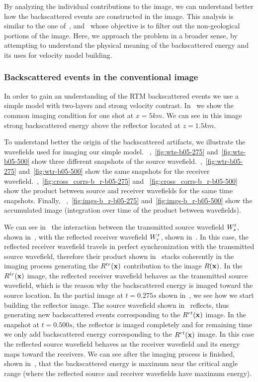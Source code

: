 By analyzing the individual contributions to the image, we can understand better how the backscattered events
are constructed in the image. This analysis is similar to the one of~\cite{fei:3130}, and~\cite{liu:S29}
whose objective is to filter out the non-geological portions of the image. Here, we approach the problem 
in a broader sense, by attempting to understand the physical meaning of the backscattered energy and its
uses for velocity model building.


\subsubsection{Backscattered events in the conventional image}

In order to gain an understanding of the RTM backscattered events we use a simple model with two-layers and strong velocity
contrast. In~ we show the common imaging condition for one shot at $x=5km$. We can see in this image strong 
backscattered energy above the reflector located at $z=1.5km$.

To understand better the origin of the backscattered artifacts, we illustrate the wavefields used for imaging our simple model.
~,~\ref{fig:wts-b05-275} and~\ref{fig:wts-b05-500} show three different snapshots
of the source wavefield.~,~\ref{fig:wtr-b05-275} and~\ref{fig:wtr-b05-500}
show the same snapshots for the receiver wavefield.~,~\ref{fig:cross_corrs-b_r-b05-275} and
~\ref{fig:cross_corrs-b_r-b05-500} show the product between source and receiver wavefields for the same time snapshots. Finally,
~,~\ref{fig:imgs-b_r-b05-275} and~\ref{fig:imgs-b_r-b05-500} show the accumulated image (integration over time of 
the product between wavefields).

We can see in~ the interaction between the transmitted source wavefield ${W_s^t}$, shown in~, with 
the reflected receiver wavefield ${W_r^r}$, shown in~. In this case, the reflected receiver wavefield travels in perfect synchronization
with the transmitted source wavefield, therefore their product shown in~ stacks coherently in the imaging 
process generating the $R^{tr}({\bf x})$ contribution to the image $R({\bf x})$. In the $R^{tr}({\bf x})$ image, the reflected 
receiver wavefield behaves as the transmitted source wavefield, which is the reason why the backscattered energy is imaged toward the source location. 
%
%
 In the partial image at $t=0.275s$ shown in~, we see how we start building the reflector image.
 The source wavefield shown in~ reflects, thus generating new backscattered events
corresponding to the  $R^{rt}({\bf x})$ image.
%
%
In the snapshot at $t=0.500s$, the reflector is imaged completely and 
 for remaining time we only add backscattered energy corresponding to the $R^{rt}({\bf x})$ image. In this case the 
reflected source wavefield behaves as the receiver wavefield and its energy maps toward the receivers. We can see after
 the imaging process is finished, shown in~, that the backscattered energy is maximum near the critical
 angle range (where the reflected source and receiver wavefields have maximum energy).

